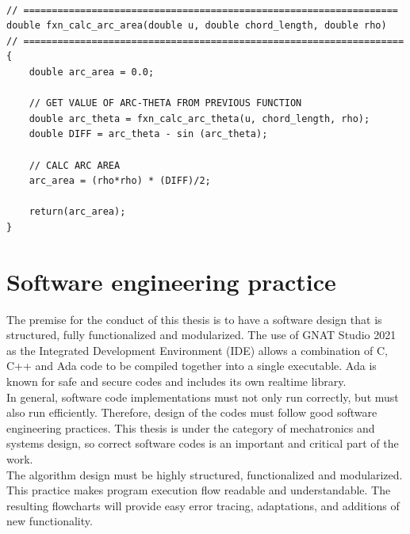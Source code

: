 \begin{lstlisting}[caption={Implementation of Approximate Arc-Area Calculation}, label=Implementation of Approximate Arc-Area Calculation]
	
// ==================================================================
double fxn_calc_arc_area(double u, double chord_length, double rho)
// ===================================================================
{
	double arc_area = 0.0;
	
	// GET VALUE OF ARC-THETA FROM PREVIOUS FUNCTION
	double arc_theta = fxn_calc_arc_theta(u, chord_length, rho);
	double DIFF = arc_theta - sin (arc_theta);

	// CALC ARC AREA
	arc_area = (rho*rho) * (DIFF)/2;
	
	return(arc_area);
}
\end{lstlisting}


\clearpage
\pagebreak

\section{Software engineering practice}
\label{sec-Software engineering practice}


The premise for the conduct of this thesis is to have a software design that is structured, fully functionalized and modularized. The use of GNAT Studio 2021 as the Integrated Development Environment (IDE) allows a combination of C, C++ and Ada code to be compiled together into a single executable. Ada is known for safe and secure codes and includes its own realtime library. \\

In general, software code implementations must not only run correctly, but must also run efficiently. Therefore, design of the codes must follow good software engineering practices. This thesis is under the category of mechatronics and systems design, so correct software codes is an important and critical part of the work. \\

The algorithm design must be highly structured, functionalized and modularized. This practice makes program execution flow readable and understandable. The resulting flowcharts will provide easy error tracing, adaptations, and additions of new functionality. \\
	
